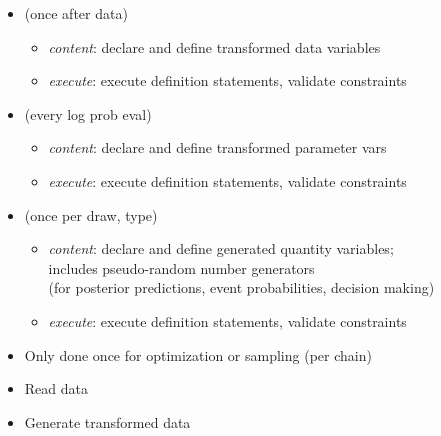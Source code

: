 \documentclass[10pt]{report}
\begin{document}
%
\begin{itemize}
\item {} (once after data)
  \vspace*{-4pt}
  \begin{itemize}\small
  \item {\slshape content}: declare and define transformed data variables
  \item {\slshape execute}: execute definition statements, validate constraints
  \end{itemize}
\item {} (every log prob eval)
  \vspace*{-4pt}
  \begin{itemize}\small
  \item {\slshape content}: declare and define transformed parameter vars
  \item {\slshape execute}: execute definition statements, validate constraints
  \end{itemize}
\item {} (once per draw,
   type)
  \vspace*{-4pt}
  \begin{itemize}\small
  \item {\slshape content}: declare and define generated quantity
    variables; \\
    includes pseudo-random number generators
    \\
    {\footnotesize (for posterior predictions, event probabilities,
      decision making)}
  \item {\slshape execute}: execute definition statements, validate constraints
  \end{itemize}
\end{itemize}


%
\begin{itemize}
\item Only done once for optimization or sampling (per chain)
\item Read data
\item Generate transformed data
\end{itemize}
\end{document}

